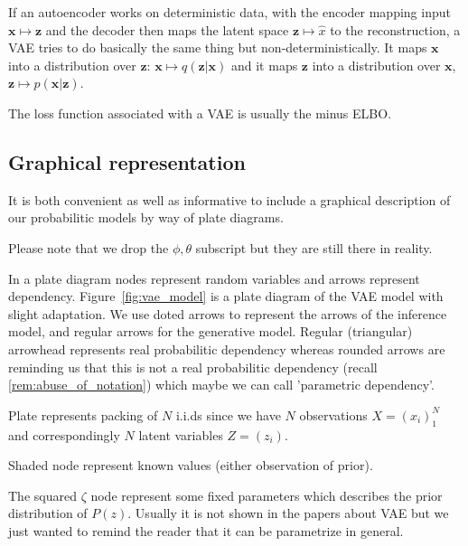 \documentclass[11pt, a4paper]{report}
\theoremstyle{plain}
\theoremstyle{definition}
\theoremstyle{remark}
\newcommand{\x}{\mathbf{x}}
\newcommand{\z}{\mathbf{z}}
\begin{document}

If an autoencoder works on deterministic data, 
with the encoder mapping input $\x \mapsto \z$ and the decoder then maps the
latent space $\z \mapsto \hat{x}$ to the reconstruction, a VAE tries to do
basically the same thing but non-deterministically.
It maps $\x$ into a distribution over $\z$: $\x \mapsto q(\z|\x)$ and it maps
$\z$ into a distribution over $\x$, $\z \mapsto p(\x|\z)$.

The loss function associated with a VAE is usually the minus ELBO.



\subsection{Graphical representation}


It is both convenient as well as informative to include a graphical description
of our probabilitic models by way of plate diagrams.

Please note that we drop the $\phi, \theta$ subscript but they are still there
in reality.

In a plate diagram nodes represent random variables and arrows
represent dependency.
Figure~\ref{fig:vae_model} is a plate diagram of the VAE model with slight
adaptation. We use doted arrows to represent the arrows of the inference model,
and regular arrows for the generative model. Regular (triangular) arrowhead
represents real probabilitic dependency whereas rounded arrows are reminding us
that this is not a real probabilitic dependency (recall
\ref{rem:abuse_of_notation}) which maybe we can call 'parametric
dependency'.

Plate represents packing of $N$ i.i.ds since we have $N$ observations $X =
(x_i)_1^N$ and correspondingly $N$ latent variables $Z = (z_i)$.

Shaded node represent known values (either observation of prior).

The squared $\zeta$ node represent some fixed parameters which describes the
prior distribution of $P(z)$. Usually it is not shown in the papers about VAE
but we just wanted to remind the reader that it can be parametrize in general.
\end{document}
